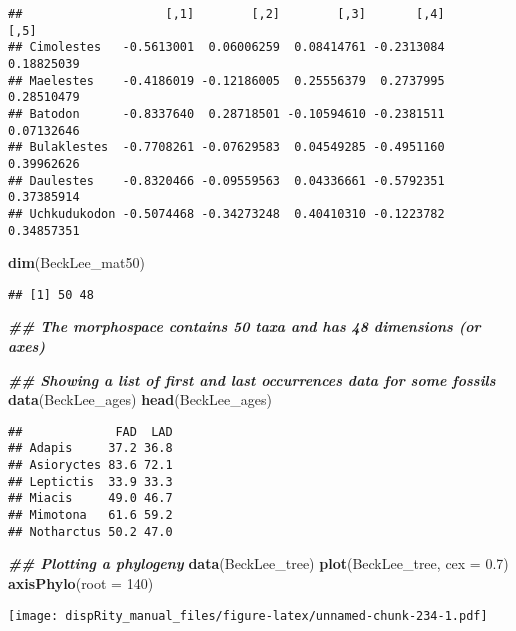 \documentclass[
]{book}
\newenvironment{Shaded}{\begin{snugshade}}{\end{snugshade}}
\newcommand{\AttributeTok}[1]{\textcolor[rgb]{0.13,0.29,0.53}{#1}}
\newcommand{\DecValTok}[1]{\textcolor[rgb]{0.00,0.00,0.81}{#1}}
\newcommand{\DocumentationTok}[1]{\textcolor[rgb]{0.56,0.35,0.01}{\textbf{\textit{#1}}}}
\newcommand{\FloatTok}[1]{\textcolor[rgb]{0.00,0.00,0.81}{#1}}
\newcommand{\FunctionTok}[1]{\textcolor[rgb]{0.13,0.29,0.53}{\textbf{#1}}}
\newcommand{\NormalTok}[1]{#1}
\begin{document}
\begin{verbatim}
##                    [,1]        [,2]        [,3]       [,4]       [,5]
## Cimolestes   -0.5613001  0.06006259  0.08414761 -0.2313084 0.18825039
## Maelestes    -0.4186019 -0.12186005  0.25556379  0.2737995 0.28510479
## Batodon      -0.8337640  0.28718501 -0.10594610 -0.2381511 0.07132646
## Bulaklestes  -0.7708261 -0.07629583  0.04549285 -0.4951160 0.39962626
## Daulestes    -0.8320466 -0.09559563  0.04336661 -0.5792351 0.37385914
## Uchkudukodon -0.5074468 -0.34273248  0.40410310 -0.1223782 0.34857351
\end{verbatim}

\begin{Shaded}
\begin{Highlighting}[]
\FunctionTok{dim}\NormalTok{(BeckLee\_mat50)}
\end{Highlighting}
\end{Shaded}

\begin{verbatim}
## [1] 50 48
\end{verbatim}

\begin{Shaded}
\begin{Highlighting}[]
\DocumentationTok{\#\# The morphospace contains 50 taxa and has 48 dimensions (or axes)}

\DocumentationTok{\#\# Showing a list of first and last occurrences data for some fossils}
\FunctionTok{data}\NormalTok{(BeckLee\_ages)}
\FunctionTok{head}\NormalTok{(BeckLee\_ages)}
\end{Highlighting}
\end{Shaded}

\begin{verbatim}
##             FAD  LAD
## Adapis     37.2 36.8
## Asioryctes 83.6 72.1
## Leptictis  33.9 33.3
## Miacis     49.0 46.7
## Mimotona   61.6 59.2
## Notharctus 50.2 47.0
\end{verbatim}

\begin{Shaded}
\begin{Highlighting}[]
\DocumentationTok{\#\# Plotting a phylogeny}
\FunctionTok{data}\NormalTok{(BeckLee\_tree)}
\FunctionTok{plot}\NormalTok{(BeckLee\_tree, }\AttributeTok{cex =} \FloatTok{0.7}\NormalTok{)}
\FunctionTok{axisPhylo}\NormalTok{(}\AttributeTok{root =} \DecValTok{140}\NormalTok{)}
\end{Highlighting}
\end{Shaded}

\texttt{[image: dispRity\_manual\_files/figure-latex/unnamed-chunk-234-1.pdf]}
\end{document}
